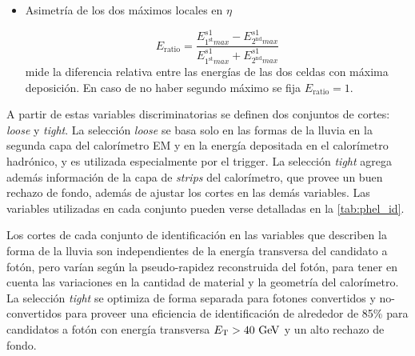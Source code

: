\begin{itemize}
\item Asimetría de los dos máximos locales en $\eta$

  \begin{equation}
    E_\mathrm{ratio} = \frac{ E^{s1}_{1^{\mathrm{st}} max} - E^{s1}_{2^{\mathrm{nd}} max} }{ E^{s1}_{1^{\mathrm{st}} max} + E^{s1}_{2^{\mathrm{nd}} max} }
  \end{equation}
  mide la diferencia relativa entre las energías de las dos celdas con máxima deposición. En caso de no haber segundo máximo
  se fija $E_\mathrm{ratio} = 1$.

\end{itemize}


A partir de estas variables discriminatorias se definen dos conjuntos de cortes: \emph{loose} y
\emph{tight}.
La selección \emph{loose} se basa solo en las formas de la lluvia
en la segunda capa del calorímetro EM y en la energía depositada en el
calorímetro hadrónico, y es utilizada especialmente por el trigger. La selección
\emph{tight} agrega además información de la capa de \emph{strips} del calorímetro, que
provee un buen rechazo de fondo, %
además de ajustar los cortes en las
demás variables. Las variables utilizadas en cada conjunto pueden verse detalladas
en la \cref{tab:phel_id}.

Los cortes de cada conjunto de identificación en las variables que
describen la forma de la lluvia son independientes de la energía transversa del
candidato a fotón, pero varían según la pseudo-rapidez reconstruida del fotón,
para tener en cuenta las variaciones en la cantidad de material y la geometría
del calorímetro.
La selección \emph{tight} se optimiza de forma separada para
fotones convertidos y no-convertidos para proveer una eficiencia de
identificación de alrededor de 85\% para candidatos a fotón con energía
transversa $\et>40 \gev$ y un alto rechazo de fondo\cite{Delmastro:1747242}.



